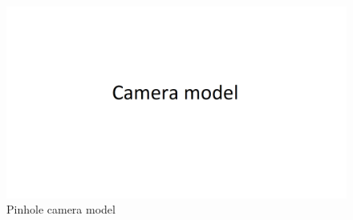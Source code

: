 \begin{figure}
    \centering
    \includegraphics[width=1\textwidth]{figures/camera_model.png}
    \caption{Pinhole camera model}
    \label{fig:cammodel}
\end{figure}